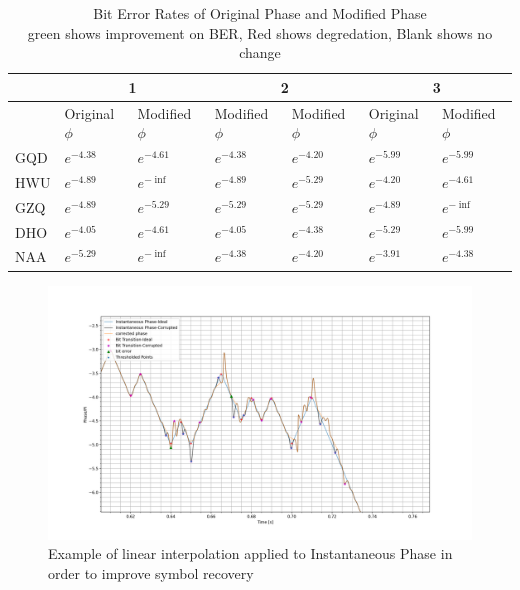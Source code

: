 \begin{table}[h!]\centering
    \begin{tabular}{l|l|l|l|l|l|l}
    & \multicolumn{2}{c}{1} & \multicolumn{2}{|c}{2} & \multicolumn{2}{|c}{3} \\
    \hline
     & Original $\phi$ & Modified $\phi$  & Modified $\phi$ & Modified $\phi$ & Original $\phi$ & Modified $\phi$ \\
     \hline
    GQD & \cellcolor{green!25}$e^{-4.38}$ &\cellcolor{green!25} $e^{-4.61}$ & \cellcolor{red!25}$e^{-4.38}$ &\cellcolor{red!25} $e^{-4.20}$ & $e^{-5.99}$ & $e^{-5.99}$ \\
    HWU &\cellcolor{green!25} $e^{-4.89}$ &\cellcolor{green!25} $e^{-\inf}$& \cellcolor{green!25}$e^{-4.89}$ & \cellcolor{green!25}$e^{-5.29}$ & \cellcolor{green!25}$e^{-4.20}$ & \cellcolor{green!25}$e^{-4.61}$ \\
    GZQ & \cellcolor{green!25}$e^{-4.89}$ & \cellcolor{green!25}$e^{-5.29}$ & $e^{-5.29}$ & $e^{-5.29}$ & \cellcolor{green!25}$e^{-4.89}$ & \cellcolor{green!25}$e^{-\inf}$ \\
    DHO &\cellcolor{green!25} $e^{-4.05}$ &\cellcolor{green!25} $e^{-4.61}$ &\cellcolor{green!25} $e^{-4.05}$ & \cellcolor{green!25}$e^{-4.38}$ & \cellcolor{green!25}$e^{-5.29}$ & \cellcolor{green!25}$e^{-5.99}$ \\
    NAA & \cellcolor{green!25}$e^{-5.29}$ & \cellcolor{green!25}$e^{-\inf}$ & \cellcolor{red!25}$e^{-4.38}$ &\cellcolor{red!25} $e^{-4.20}$ & \cellcolor{green!25}$e^{-3.91}$ & \cellcolor{green!25}$e^{-4.38}$
    \end{tabular}%
\caption{\centering Bit Error Rates of Original Phase and Modified Phase 
\\
green shows improvement on BER, Red shows degredation, Blank shows no change}
\label{tab:errCorr}
\end{table}

\begin{figure}[h!]
    \centering
    \includegraphics[width = \textwidth]{figs/error/example_interpolation.png}
    \caption{Example of linear interpolation applied to Instantaneous Phase in order to improve symbol recovery}
    \label{fig:interpolation}
\end{figure}